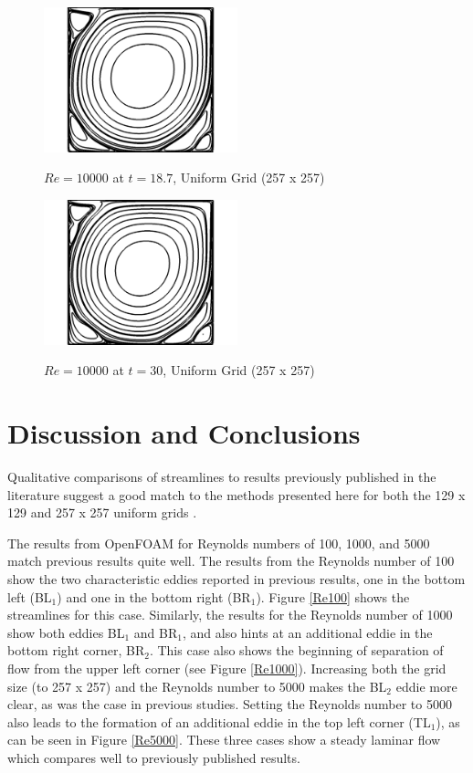 \documentclass[twocolumn,10pt]{asme2ej}
\begin{document}
\begin{figure}[htb]
\begin{center}
\includegraphics[width=0.5\textwidth]{figure/Re10000.png}
\caption{$Re = 10000$ at $t = 18.7$, Uniform Grid (257 x 257)}
\label{Re10000}
\vspace{5mm} %
\includegraphics[width=0.5\textwidth]{figure/Re10000-fin.png}
\caption{$Re = 10000$ at $t = 30$, Uniform Grid (257 x 257)}
\label{Re10000-fin}
\end{center}
\end{figure}

\section{Discussion and Conclusions}
Qualitative comparisons of streamlines to results previously published in the literature suggest a good match to the methods presented here for both the 129 x 129 and 257 x 257 uniform grids \cite{ghia1982high}.

The results from OpenFOAM for Reynolds numbers of 100, 1000, and 5000 match previous results quite well. The results from the Reynolds number of 100 show the two characteristic eddies reported in previous results, one in the bottom left (BL$_1$) and one in the bottom right (BR$_1$). Figure \ref{Re100} shows the streamlines for this case. Similarly, the results for the Reynolds number of 1000 show both eddies BL$_1$ and BR$_1$, and also hints at an additional eddie in the bottom right corner, BR$_2$. This case also shows the beginning of separation of flow from the upper left corner (see Figure \ref{Re1000}). Increasing both the grid size (to 257 x 257) and the Reynolds number to 5000 makes the BL$_2$ eddie more clear, as was the case in previous studies. Setting the Reynolds number to 5000 also leads to the formation of an additional eddie in the top left corner (TL$_1$), as can be seen in Figure \ref{Re5000}. These three cases show a steady laminar flow which compares well to previously published results.
\end{document}
